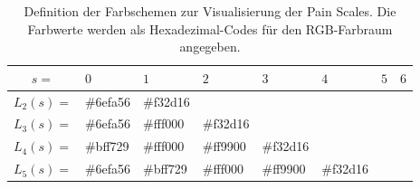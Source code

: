 \begin{table}[h]
\centering
\caption{Definition der Farbschemen zur Visualisierung der Pain Scales. Die Farbwerte werden als Hexadezimal-Codes für den RGB-Farbraum angegeben. }
\label{tab:color_shemes}
\begin{tabular}{@{}clllllll@{}}
\toprule
              $s=$         & $0$                                                     & $1$                                                     & $2$                                                     & $3$                                                     & $4$                                                     & $5$                                                     & $6$                                                     \\ \midrule
\multicolumn{1}{l|}{$L_2(s) = $} & \multicolumn{1}{l|}{\cellcolor[HTML]{6EFA56}\#6efa56} & \multicolumn{1}{l|}{\cellcolor[HTML]{F32D16}\#f32d16} &                                                       &                                                       &                                                       &                                                       &                                                       \\ \cmidrule(lr){2-4}
\multicolumn{1}{l|}{$L_3(s) = $} & \multicolumn{1}{l|}{\cellcolor[HTML]{6EFA56}\#6efa56} & \multicolumn{1}{l|}{\cellcolor[HTML]{FFF000}\#fff000} & \multicolumn{1}{l|}{\cellcolor[HTML]{F32D16}\#f32d16} &                                                       &                                                       &                                                       &                                                       \\ \cmidrule(lr){2-5}
\multicolumn{1}{l|}{$L_4(s) = $} & \multicolumn{1}{l|}{\cellcolor[HTML]{B6F52B}\#bff729} & \multicolumn{1}{l|}{\cellcolor[HTML]{FFF000}\#fff000} & \multicolumn{1}{l|}{\cellcolor[HTML]{F98E0B}\#ff9900} & \multicolumn{1}{l|}{\cellcolor[HTML]{F32D16}\#f32d16} &       &                                                       &                                                       \\ \cmidrule(lr){2-6}
\multicolumn{1}{l|}{$L_5(s) = $} & \multicolumn{1}{l|}{\cellcolor[HTML]{6EFA56}\#6efa56} & \multicolumn{1}{l|}{\cellcolor[HTML]{BFF729}\#bff729} & \multicolumn{1}{l|}{\cellcolor[HTML]{FFF000}\#fff000} & \multicolumn{1}{l|}{\cellcolor[HTML]{F98E0B}\#ff9900} & \multicolumn{1}{l|}{\cellcolor[HTML]{F32D16}\#f32d16} &                                                       &                                                       \\ \cmidrule(lr){2-7}

\end{tabular}
\end{table}
